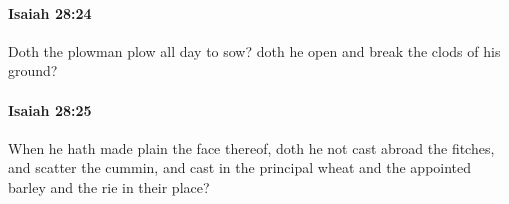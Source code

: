 		\paragraph{Isaiah 28:24} %
			\label{ISAIAH-28-24}

			Doth the plowman plow all day to sow? doth he open and break the clods of his ground?


		\paragraph{Isaiah 28:25} %
			\label{ISAIAH-28-25}

			When he hath made plain the face thereof, doth he not cast abroad the fitches, and scatter the cummin, and cast in the principal wheat and the appointed barley and the rie in their place?


